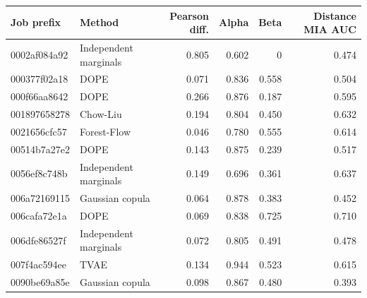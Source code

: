 \begin{tabular}{@{}llrrrr@{}}
\toprule
Job prefix & Method & Pearson diff. & Alpha & Beta & Distance MIA AUC \\
\midrule
0002af084a92 & Independent marginals & 0.805 & 0.602 & 0 & 0.474 \\
000377f02a18 & DOPE & 0.071 & 0.836 & 0.558 & 0.504 \\
000f66aa8642 & DOPE & 0.266 & 0.876 & 0.187 & 0.595 \\
001897658278 & Chow-Liu & 0.194 & 0.804 & 0.450 & 0.632 \\
0021656cfc57 & Forest-Flow & 0.046 & 0.780 & 0.555 & 0.614 \\
00514b7a27e2 & DOPE & 0.143 & 0.875 & 0.239 & 0.517 \\
0056ef8c748b & Independent marginals & 0.149 & 0.696 & 0.361 & 0.637 \\
006a72169115 & Gaussian copula & 0.064 & 0.878 & 0.383 & 0.452 \\
006cafa72e1a & DOPE & 0.069 & 0.838 & 0.725 & 0.710 \\
006dfe86527f & Independent marginals & 0.072 & 0.805 & 0.491 & 0.478 \\
007f4ac594ee & TVAE & 0.134 & 0.944 & 0.523 & 0.615 \\
0090be69a85e & Gaussian copula & 0.098 & 0.867 & 0.480 & 0.393 \\
\bottomrule
\end{tabular}
